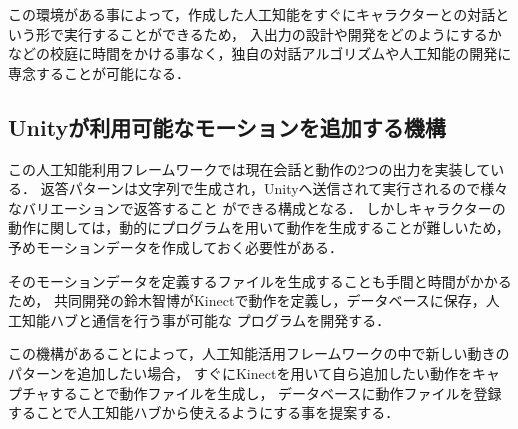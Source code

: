 この環境がある事によって，作成した人工知能をすぐにキャラクターとの対話という形で実行することができるため，
入出力の設計や開発をどのようにするかなどの校庭に時間をかける事なく，独自の対話アルゴリズムや人工知能の開発に専念することが可能になる．
\subsection{Unityが利用可能なモーションを追加する機構}
この人工知能利用フレームワークでは現在会話と動作の2つの出力を実装している．
返答パターンは文字列で生成され，Unityへ送信されて実行されるので様々なバリエーションで返答すること
ができる構成となる．
しかしキャラクターの動作に関しては，動的にプログラムを用いて動作を生成することが難しいため，
予めモーションデータを作成しておく必要性がある．

そのモーションデータを定義するファイルを生成することも手間と時間がかかるため，
共同開発の鈴木智博がKinectで動作を定義し，データベースに保存，人工知能ハブと通信を行う事が可能な
プログラムを開発する\cite{suzuki}．

この機構があることによって，人工知能活用フレームワークの中で新しい動きのパターンを追加したい場合，
すぐにKinectを用いて自ら追加したい動作をキャプチャすることで動作ファイルを生成し，
データベースに動作ファイルを登録することで人工知能ハブから使えるようにする事を提案する．